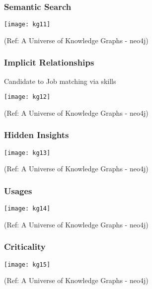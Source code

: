 \begin{frame}[fragile]\frametitle{Semantic Search}
 
 
			\begin{center}
			\texttt{[image: kg11]}
			\end{center}	
			
			{\tiny (Ref: A Universe of Knowledge Graphs - neo4j)}
		
	
\end{frame}

\begin{frame}[fragile]\frametitle{Implicit Relationships}
 
	Candidate to Job matching via skills
 
			\begin{center}
			\texttt{[image: kg12]}
			\end{center}	
			
			{\tiny (Ref: A Universe of Knowledge Graphs - neo4j)}
		
	
\end{frame}

\begin{frame}[fragile]\frametitle{Hidden Insights}
 
 
			\begin{center}
			\texttt{[image: kg13]}
			\end{center}	
			
			{\tiny (Ref: A Universe of Knowledge Graphs - neo4j)}
		
	
\end{frame}

\begin{frame}[fragile]\frametitle{Usages}
 
 
			\begin{center}
			\texttt{[image: kg14]}
			\end{center}	
			
			{\tiny (Ref: A Universe of Knowledge Graphs - neo4j)}
		
	
\end{frame}

\begin{frame}[fragile]\frametitle{Criticality}
 
 
			\begin{center}
			\texttt{[image: kg15]}
			\end{center}	
			
			{\tiny (Ref: A Universe of Knowledge Graphs - neo4j)}
		
	
\end{frame}



